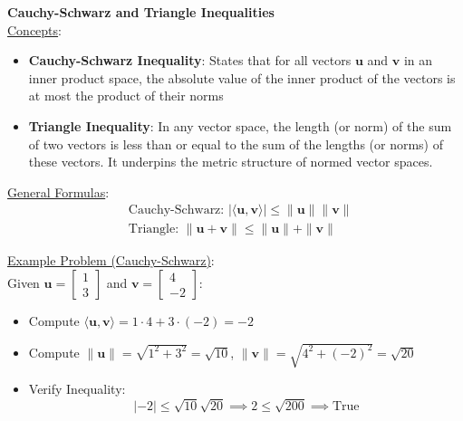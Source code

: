 \documentclass[8pt, a4paper, landscape]{extarticle} %
\begin{document}
\begin{multicols*}{4}
  \textbf{Cauchy-Schwarz and Triangle Inequalities}\\
  \underline{Concepts}:
  \begin{itemize}
    \item \textbf{Cauchy-Schwarz Inequality}: States that for all vectors \( \mathbf{u} \) and \( \mathbf{v} \) in an inner product space, the absolute value of the inner product of the vectors is at most the product of their norms
    \item \textbf{Triangle Inequality}: In any vector space, the length (or norm) of the sum of two vectors is less than or equal to the sum of the lengths (or norms) of these vectors. It underpins the metric structure of normed vector spaces.
  \end{itemize}

  \underline{General Formulas}:
  \[
    \begin{aligned}
       & \text{Cauchy-Schwarz: } |\langle \mathbf{u}, \mathbf{v} \rangle| \leq \|\mathbf{u}\| \|\mathbf{v}\| \\
       & \text{Triangle: } \|\mathbf{u} + \mathbf{v}\| \leq \|\mathbf{u}\| + \|\mathbf{v}\|
    \end{aligned}
  \]

  \underline{Example Problem (Cauchy-Schwarz)}:\\
  Given \( \mathbf{u} = \begin{bmatrix} 1 \\ 3 \end{bmatrix} \) and \( \mathbf{v} = \begin{bmatrix} 4 \\ -2 \end{bmatrix} \):
  \begin{itemize}
    \item Compute \(\langle \mathbf{u}, \mathbf{v} \rangle = 1 \cdot 4 + 3 \cdot (-2) = -2\)
    \item Compute \(\|\mathbf{u}\| = \sqrt{1^2 + 3^2} = \sqrt{10}\), \(\|\mathbf{v}\| = \sqrt{4^2 + (-2)^2} = \sqrt{20}\)
    \item Verify Inequality:
          \[
            |-2| \leq \sqrt{10} \sqrt{20} \implies 2 \leq \sqrt{200} \implies \text{True}
          \]
  \end{itemize}


\end{multicols*}
\end{document}
